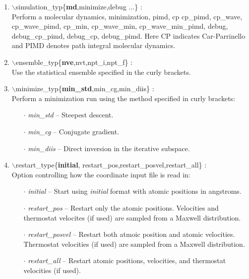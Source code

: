 \documentclass[12pt,titlepage]{article}
\begin{document}
\begin{enumerate}
 \vspace{0.15in}
 \item $\backslash$simulation\_typ\{{\bf md},minimize,debug ...\} : \\
     Perform a molecular dynamics, minimization, pimd, cp
     cp\_pimd, cp\_wave, cp\_wave\_pimd, cp\_min, cp\_wave\_min,
     cp\_wave\_min\_pimd,
     debug, debug\_cp\_pimd, debug\_cp, debug\_pimd. Here CP indicates
     Car-Parrinello and PIMD  denotes path integral molecular dynamics.

 \vspace{0.15in} 
 \item  $\backslash$ensemble\_typ\{{\bf nve},nvt,npt\_i,npt\_f\} : \\
     Use the statistical ensemble specified in the curly brackets.

 \vspace{0.15in} 
 \item  $\backslash$minimize\_typ\{{\bf min\_std},min\_cg,min\_diis\} : \\
     Perform a minimization run using the method specified in curly brackets:
     \begin{itemize}
        \item[$\cdot$] {\it min\_std} -- Steepest descent.
        \item[$\cdot$] {\it min\_cg} -- Conjugate gradient.
        \item[$\cdot$] {\it min\_diis} -- Direct inversion in the 
                                          iterative subspace.
     \end{itemize}

 \vspace{0.15in} 
 \item  $\backslash$restart\_type\{{\bf initial},
             restart\_pos,restart\_posvel,restart\_all\} : \\
     Option controlling how the coordinate input file is read in:
     \begin{itemize}
       \item[$\cdot$] {\it initial} -- Start using {\it initial} format 
                                        with atomic positions in angstroms.
       \item[$\cdot$] {\it restart\_pos} -- Restart only the atomic positions.
                    Velocities and thermostat velocites (if used) are 
                    sampled from a Maxwell distribution.
       \item[$\cdot$] {\it restart\_posvel} -- Restart both atmoic position 
                     and atomic velocities.  Thermostat velocities (if used) 
                     are sampled from a Maxwell distribution.
       \item[$\cdot$] {\it restart\_all} -- Restart atomic positions, 
                     velocities, and thermostat velocities (if used).
     \end{itemize}


\end{enumerate}
\end{document}
